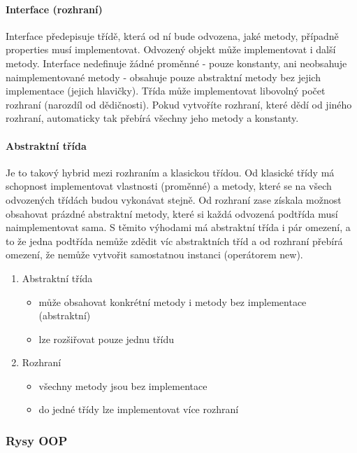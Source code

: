 \documentclass[10pt,a4paper]{article}
\begin{document}
\paragraph{Interface (rozhraní)}

Interface předepisuje třídě, která od ní bude odvozena, jaké metody, případně properties musí implementovat. Odvozený objekt může implementovat i další metody. Interface nedefinuje žádné proměnné - pouze konstanty, ani neobsahuje naimplementované metody - obsahuje pouze abstraktní metody bez jejich implementace (jejich hlavičky). Třída může implementovat libovolný počet rozhraní (narozdíl od dědičnosti). Pokud vytvoříte rozhraní, které dědí od jiného rozhraní, automaticky tak přebírá všechny jeho metody a konstanty.

\paragraph{Abstraktní třída}

Je to takový hybrid mezi rozhraním a klasickou třídou. Od klasické třídy má schopnost implementovat vlastnosti (proměnné) a metody, které se na všech odvozených třídách budou vykonávat stejně. Od rozhraní zase získala možnost obsahovat prázdné abstraktní metody, které si každá odvozená podtřída musí naimplementovat sama. S těmito výhodami má abstraktní třída i pár omezení, a to že jedna podtřída nemůže zdědit víc abstraktních tříd a od rozhraní přebírá omezení, že nemůže vytvořit samostatnou instanci (operátorem new).

\begin{enumerate}
\item Abstraktní třída
\begin{itemize}
\item může obsahovat konkrétní metody i metody bez implementace (abstraktní)
\item lze rozšiřovat pouze jednu třídu
\end{itemize}
\item Rozhraní
\begin{itemize}
\item všechny metody jsou bez implementace
\item do jedné třídy lze implementovat více rozhraní
\end{itemize}
\end{enumerate}
 

\subsubsection{Rysy OOP}
\end{document}
